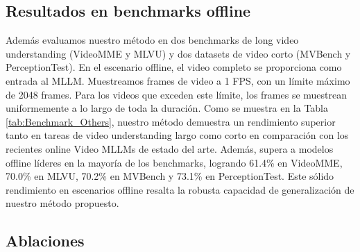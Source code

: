 \subsection{Resultados en benchmarks offline}



Además evaluamos nuestro método en dos benchmarks de long video understanding (VideoMME\cite{fu2024videomme} y MLVU\cite{zhou2024mlvu}) y dos datasets de video corto (MVBench\cite{li2024mvbench} y PerceptionTest\cite{patraucean2023perceptiontest}). En el escenario offline, el video completo se proporciona como entrada al MLLM. Muestreamos frames de video a 1 FPS, con un límite máximo de 2048 frames. Para los videos que exceden este límite, los frames se muestrean uniformemente a lo largo de toda la duración. Como se muestra en la Tabla \ref{tab:Benchmark_Others}, nuestro método demuestra un rendimiento superior tanto en tareas de video understanding largo como corto en comparación con los recientes online Video MLLMs de estado del arte. Además, supera a modelos offline líderes en la mayoría de los benchmarks, logrando 61.4\% en VideoMME, 70.0\% en MLVU, 70.2\% en MVBench y 73.1\% en PerceptionTest. Este sólido rendimiento en escenarios offline resalta la robusta capacidad de generalización de nuestro método propuesto.

\subsection{Ablaciones}

